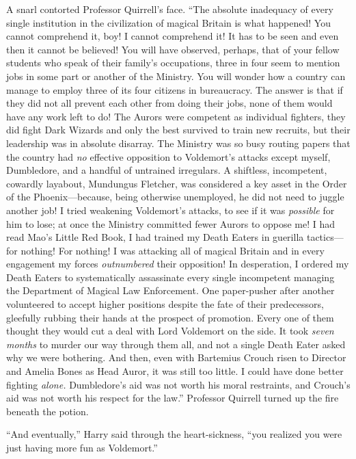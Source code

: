 A snarl contorted Professor Quirrell’s face. “The absolute inadequacy of every
single institution in the civilization of magical Britain is what happened! You
cannot comprehend it, boy! I cannot comprehend it! It has to be seen and even
then it cannot be believed! You will have observed, perhaps, that of your
fellow students who speak of their family’s occupations, three in four seem to
mention jobs in some part or another of the Ministry. You will wonder how a
country can manage to employ three of its four citizens in bureaucracy. The
answer is that if they did not all prevent each other from doing their jobs,
none of them would have any work left to do! The Aurors were competent as
individual fighters, they did fight Dark Wizards and only the best survived to
train new recruits, but their leadership was in absolute disarray. The Ministry
was so busy routing papers that the country had \emph{no} effective opposition
to Voldemort’s attacks except myself, Dumbledore, and a handful of untrained
irregulars. A shiftless, incompetent, cowardly layabout, Mundungus Fletcher,
was considered a key asset in the Order of the Phoenix—because, being
otherwise unemployed, he did not need to juggle another job! I tried weakening
Voldemort’s attacks, to see if it was \emph{possible} for him to lose; at once
the Ministry committed fewer Aurors to oppose me! I had read Mao’s Little Red
Book, I had trained my Death Eaters in guerilla tactics—for nothing! For
nothing! I was attacking all of magical Britain and in every engagement my
forces \emph{outnumbered} their opposition! In desperation, I ordered my Death
Eaters to systematically assassinate every single incompetent managing the
Department of Magical Law Enforcement. One paper-pusher after another
volunteered to accept higher positions despite the fate of their predecessors,
gleefully rubbing their hands at the prospect of promotion. Every one of them
thought they would cut a deal with Lord Voldemort on the side. It took
\emph{seven months} to murder our way through them all, and not a single Death
Eater asked why we were bothering. And then, even with Bartemius Crouch risen
to Director and Amelia Bones as Head Auror, it was still too little. I could
have done better fighting \emph{alone.} Dumbledore’s aid was not worth his
moral restraints, and Crouch’s aid was not worth his respect for the law.”
Professor Quirrell turned up the fire beneath the potion.

“And eventually,” Harry said through the heart-sickness, “you realized you were
just having more fun as Voldemort.”

